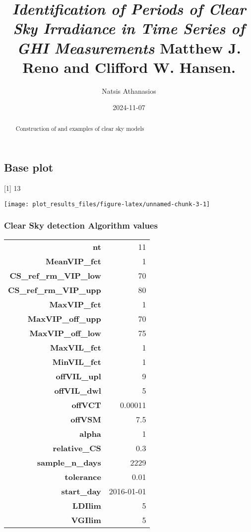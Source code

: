 \documentclass[
  10pt,
  a4paper,oneside]{article}
\title{\emph{Identification of Periods of Clear Sky Irradiance in Time Series of GHI Measurements} Matthew J. Reno and Clifford W. Hansen.}
\author{Natsis Athanasios}
\date{2024-11-07}
\begin{document}
\maketitle
\begin{abstract}
Construction of and examples of clear sky models
\end{abstract}

{
\hypersetup{linkcolor=}
\setcounter{tocdepth}{2}
\tableofcontents
}
\subsection{Base plot}\label{base-plot}

{[}1{]} 13

\begin{center}\texttt{[image: plot\_results\_files/figure-latex/unnamed-chunk-3-1]} \end{center}

\subsubsection{Clear Sky detection Algorithm values}\label{clear-sky-detection-algorithm-values}

\begin{longtable}[]{@{}rr@{}}
\toprule\noalign{}
\endhead
\bottomrule\noalign{}
\endlastfoot
\textbf{nt} & 11 \\
\textbf{MeanVIP\_fct} & 1 \\
\textbf{CS\_ref\_rm\_VIP\_low} & 70 \\
\textbf{CS\_ref\_rm\_VIP\_upp} & 80 \\
\textbf{MaxVIP\_fct} & 1 \\
\textbf{MaxVIP\_off\_upp} & 70 \\
\textbf{MaxVIP\_off\_low} & 75 \\
\textbf{MaxVIL\_fct} & 1 \\
\textbf{MinVIL\_fct} & 1 \\
\textbf{offVIL\_upl} & 9 \\
\textbf{offVIL\_dwl} & 5 \\
\textbf{offVCT} & 0.00011 \\
\textbf{offVSM} & 7.5 \\
\textbf{alpha} & 1 \\
\textbf{relative\_CS} & 0.3 \\
\textbf{sample\_n\_days} & 2229 \\
\textbf{tolerance} & 0.01 \\
\textbf{start\_day} & 2016-01-01 \\
\textbf{LDIlim} & 5 \\
\textbf{VGIlim} & 5 \\
\end{longtable}
\end{document}
